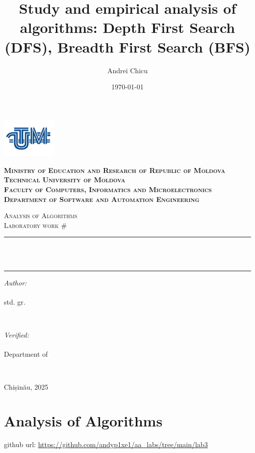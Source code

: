 \documentclass[a4paper,12pt]{article}
\author{Andrei Chicu}
\date{\today}
\title{Study and empirical analysis of algorithms: Depth First Search (DFS), Breadth First Search (BFS)}
\begin{document}
\makeatletter
\begin{titlepage}
\centering

\includegraphics[height=2cm]{utm_logo.png}

\bfseries
\textsc{Ministry of Education and Research of Republic of Moldova} \\
\textsc{Technical University of Moldova} \\
\textsc{Faculty of Computers, Informatics and Microelectronics} \\
\textsc{Department of Software and Automation Engineering} \\
\mdseries

\vfill

\textsc{\Large Analysis of Algorithms} \\
\textsc{\large Laboratory work \#\@labno}\\[0.5cm]

\vspace{12pt}
\newcommand{\HRule}{\rule{\linewidth}{0.5mm}}
\HRule \\[0.2cm]
{ \LARGE \bfseries \@title }\\[0.4cm]
\HRule
\vfill

\begin{minipage}[t]{0.4\textwidth}
\begin{flushleft} \large
\emph{Author:} \\
\@author\\                        
std. gr. \@group
\end{flushleft}
\end{minipage}
~
\begin{minipage}[t]{0.4\textwidth}
\raggedleft \large
\emph{Verified:} \\
\@prof \\
Department of \textsc{\@profdep}
\end{minipage}\\[3cm]
\vfill

Chișinău, 2025
\end{titlepage}
\makeatother
\setcounter{page}{2}
\section{Analysis of Algorithms}
\label{sec:orgcb8df83}
github url: \url{https://github.com/andyp1xe1/aa_labs/tree/main/lab3}
\end{document}
